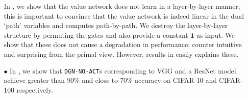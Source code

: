 In , we show that the value network does not learn in a layer-by-layer manner; this is important to convince that the value network is indeed linear in the dual `path' variables and computes path-by-path.
We destroy the layer-by-layer structure by permuting the gates and also provide a constant $\mathbf{1}$ as input. We show that these does not cause a degradation in performance: counter intuitive and surprising from the primal view. However, results in  easily explains these.%

$\bullet$ In , we show that \texttt{DGN-NO-ACT}s corresponding to VGG and a ResNet model achieve greater than $90\%$ and close to $70\%$ accuracy on CIFAR-10 and CIFAR-100 respectively. 




